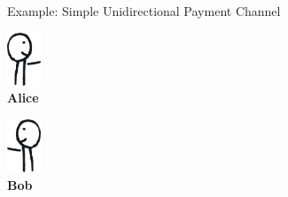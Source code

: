 \documentclass[]{beamer}
\begin{document}
\begin{frame}{Example: Simple Unidirectional Payment Channel}
	\begin{minipage}{0.1\linewidth}
		\vspace{-0.5cm}
		\centering
		\includegraphics[width=1cm]{../assets/images/agents/handing_right}
		\\ \hspace{-0.35cm} \textbf{Alice}
	\end{minipage}%
	\begin{minipage}{0.8\linewidth}
		\begin{figure}
		\begin{tikzpicture}[scale=0.9, every node/.style={scale=0.9}]
			
		\end{tikzpicture}
		\vspace{0.5cm}
		\end{figure}
	\end{minipage}%
	\begin{minipage}{0.1\linewidth}
		\vspace{-0.5cm}
		\centering
		\includegraphics[width=1cm]{../assets/images/agents/handing_left}
		\\ \hspace{0.3cm}\textbf{Bob}
	\end{minipage}
\end{frame}

\end{document}
